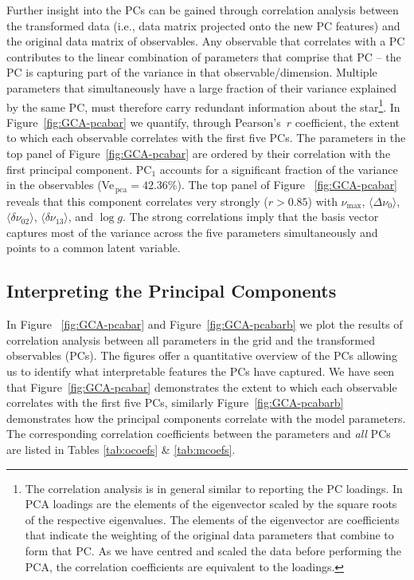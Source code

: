 Further insight into the PCs can be gained through correlation analysis between the transformed data (i.e., data matrix projected onto the new PC features) and the original data matrix of observables.
Any observable that correlates with a PC contributes to the linear combination of parameters that comprise that PC -- the PC is capturing part of the variance in that observable/dimension. 
Multiple parameters that simultaneously have a large fraction of their variance explained by the same PC, must therefore carry redundant information about the star\footnote{The correlation analysis is in general similar to reporting the PC loadings. 
In PCA loadings are the elements of the eigenvector scaled by the square roots of the respective eigenvalues.
The elements of the eigenvector are coefficients that indicate the weighting of the original data parameters that combine to form that PC. 
As we have centred and scaled the data before performing the PCA, the correlation coefficients are equivalent to the loadings.}.
In Figure~\ref{fig:GCA-pcabar} we quantify, through Pearson's~$r$ coefficient, the extent to which each observable correlates with the first five PCs.
The parameters in the top panel of Figure~\ref{fig:GCA-pcabar} are ordered by their correlation with the first principal component. 
PC$_1$ accounts for a significant fraction of the variance in the observables (Ve${_{\, \text{pca}}=42.36\%}$). 
The top panel of  Figure~ \ref{fig:GCA-pcabar} reveals that this component correlates very strongly 
(${r > 0.85}$)  with   
$\nu_{\max}$, 
${\langle\Delta\nu_0\rangle}$,
${\langle\delta\nu_{02}\rangle}$, 
${\langle\delta\nu_{13}\rangle}$,
and ${\log{} g}$.  
The strong correlations imply that the basis vector captures most of the variance across the five parameters simultaneously and points to a common latent variable. 


\subsection{Interpreting the Principal Components}
\label{sec:intPC}


In Figure~ \ref{fig:GCA-pcabar} and Figure~\ref{fig:GCA-pcabarb} we plot the results of correlation analysis between all parameters in the grid and the transformed observables (PCs). 
The figures offer a quantitative overview of the PCs allowing  us to identify what interpretable features the PCs have captured.
We have seen that Figure~\ref{fig:GCA-pcabar} demonstrates the extent to which each observable correlates with the first five PCs, similarly  Figure~\ref{fig:GCA-pcabarb} demonstrates how the principal components correlate with the model parameters. The corresponding correlation coefficients between the parameters and \emph{all} PCs are listed in Tables \ref{tab:ocoefs} \& \ref{tab:mcoefs}.

